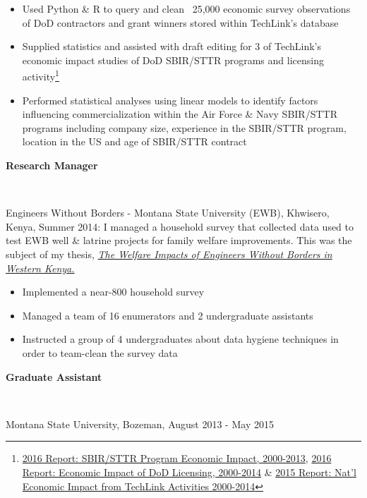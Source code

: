 \documentclass[resmargin, line, pifont ,palatino,courier]{res}
\newcommand{\tab}[1][1cm]{\hspace*{#1}}
\newcommand{\subtext}[1]{\tighter ~ \newline \tab[0.5cm] \parbox{\fullwidth}{#1}}
\newcommand{\fullwidth}{11.5cm}
\newcommand{\tight}{\vspace{-0.5cm}}
\newcommand{\tighter}{\vspace{-0.75cm}}
\begin{document}
\begin{resume}
	\begin{itemize}
		\item Used Python \& R to query and clean ~25,000 economic survey observations of DoD contractors and grant winners stored within TechLink's database
		\item  Supplied statistics and assisted with draft editing for 3 of TechLink's economic impact studies of DoD SBIR/STTR programs and licensing activity\footnote{\href{https://techlinkcenter.org/2016-report-navy-sbirsttr-economic-impact/}{2016 Report: SBIR/STTR Program Economic Impact, 2000-2013}, \href{http://techlinkcenter.org/articles/2016-report-economic-impact-dod-licensing-2000-2014}{2016 Report: Economic Impact of DoD Licensing, 2000-2014} \& \href{https://techlinkcenter.org/2015-report-natl-economic-impact-techlink-activities-2000-2014/}{2015 Report: Nat’l Economic Impact from TechLink Activities 2000-2014}}
		\item Performed statistical analyses using linear models to identify factors influencing commercialization within the  Air Force \& Navy SBIR/STTR programs including company size, experience in the SBIR/STTR program, location in the US and age of SBIR/STTR contract
	\end{itemize}
		
\textbf{Research Manager} 

	\subtext{Engineers Without Borders - Montana State University (EWB), Khwisero, Kenya, Summer 2014: I managed a household survey that collected data used to test EWB well \& latrine projects for family welfare improvements. This was the subject of my thesis, \href{https://www.slideshare.net/slideshow/embed_code/key/K6qYsOYvj9u5Ab}{\textit{The Welfare Impacts of Engineers Without Borders in Western Kenya.}}}
	
	\tight
	
	\begin{itemize}
		\item Implemented a near-800 household survey
		\item Managed a team of 16 enumerators and 2 undergraduate assistants
		\item Instructed a group of 4 undergraduates about data hygiene techniques in order to team-clean the survey data
	\end{itemize}  		
				
\textbf{Graduate Assistant} 

	\subtext{Montana State University, Bozeman, August 2013 -  May 2015}
	
	\tight


\end{resume}
\end{document}
